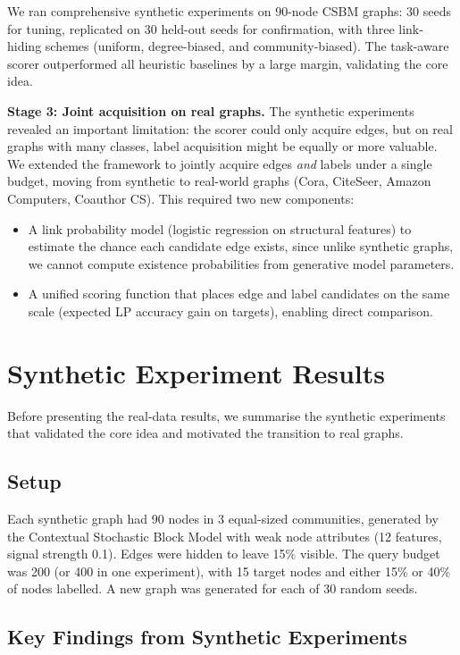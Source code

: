\documentclass[12pt,a4paper,oneside]{report}
\begin{document}
We ran comprehensive synthetic experiments on 90-node CSBM graphs: 30 seeds for tuning, replicated on 30 held-out seeds for confirmation, with three link-hiding schemes (uniform, degree-biased, and community-biased). The task-aware scorer outperformed all heuristic baselines by a large margin, validating the core idea.

\textbf{Stage 3: Joint acquisition on real graphs.} The synthetic experiments revealed an important limitation: the scorer could only acquire edges, but on real graphs with many classes, label acquisition might be equally or more valuable. We extended the framework to jointly acquire edges \emph{and} labels under a single budget, moving from synthetic to real-world graphs (Cora, CiteSeer, Amazon Computers, Coauthor CS). This required two new components:
\begin{itemize}[leftmargin=2em]
    \item A link probability model (logistic regression on structural features) to estimate the chance each candidate edge exists, since unlike synthetic graphs, we cannot compute existence probabilities from generative model parameters.
    \item A unified scoring function that places edge and label candidates on the same scale (expected LP accuracy gain on targets), enabling direct comparison.
\end{itemize}

\section{Synthetic Experiment Results}
\label{sec:synth}

Before presenting the real-data results, we summarise the synthetic experiments that validated the core idea and motivated the transition to real graphs.

\subsection{Setup}

Each synthetic graph had 90 nodes in 3 equal-sized communities, generated by the Contextual Stochastic Block Model with weak node attributes (12 features, signal strength 0.1). Edges were hidden to leave 15\% visible. The query budget was 200 (or 400 in one experiment), with 15 target nodes and either 15\% or 40\% of nodes labelled. A new graph was generated for each of 30 random seeds.

\subsection{Key Findings from Synthetic Experiments}
\end{document}

